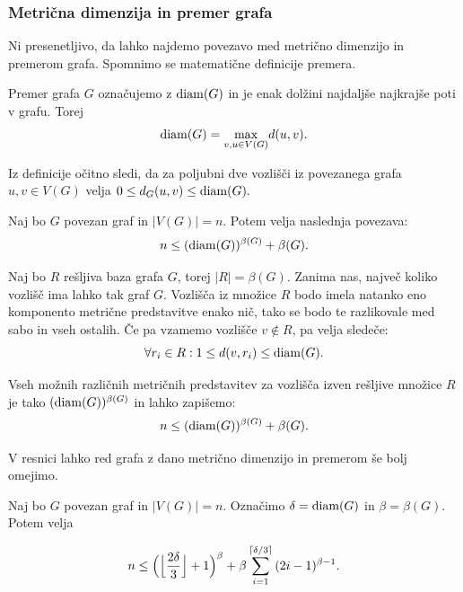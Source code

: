 \documentclass[mat1, tisk]{fmfdelo}
\begin{document}
\subsubsection{Metrična dimenzija in premer grafa} \label{ss:mdim_premer}

Ni presenetljivo, da lahko najdemo povezavo med metrično dimenzijo in premerom grafa.
Spomnimo se matematične definicije premera.

\begin{definicija} \label{def:premer}
    Premer grafa $G$ označujemo z ${\rm diam}(G)$ in je enak dolžini najdaljše najkrajše 
    poti v grafu. Torej $${\rm diam}(G) = \underset{v, u \in V(G)}{\max} d(u, v).$$
\end{definicija}

Iz definicije očitno sledi, da za poljubni dve vozlišči iz povezanega grafa $u, v \in V(G)$
velja $0 \leq d_G (u, v) \leq {\rm diam}(G).$

\begin{trditev}\label{trd:groba_meja_mdim_premer}
    Naj bo $G$ povezan graf in $|V(G)| = n$. Potem velja naslednja povezava:
    $$n \leq ({\rm diam}(G))^{\beta (G)} + \beta (G). $$
\end{trditev}

\begin{dokaz}
    Naj bo $R$ rešljiva baza grafa $G$, torej $|R| = \beta(G).$ Zanima nas, največ koliko 
    vozlišč ima lahko tak graf $G$. Vozlišča iz množice $R$ bodo imela natanko eno 
    komponento metrične predstavitve enako nič, tako se bodo te razlikovale med sabo in 
    vseh ostalih. Če pa vzamemo vozlišče $v \notin R$, pa velja sledeče:
    $$\forall r_i \in R: 1 \leq d(v, r_i) \leq {\rm diam}(G).$$
    
    Vseh možnih različnih metričnih predstavitev za vozlišča izven rešljive množice $R$ 
    je tako $({\rm diam}(G))^{\beta (G)}$
    in lahko zapišemo:
    $$n \leq ({\rm diam}(G))^{\beta (G)} + \beta (G).$$
\end{dokaz}

V resnici lahko red grafa z dano metrično dimenzijo in premerom še bolj omejimo.

\begin{trditev} \label{trd:meja_mdim_premer}
    Naj bo $G$ povezan graf in $|V(G)| = n$. Označimo $ \delta = {\rm diam}(G)$ in 
    $\beta = \beta (G)$. Potem velja

    $$n \leq \Bigl ( \Bigl \lfloor {\frac{2 \delta}{3}}\Bigr \rfloor + 1 \Bigr )^{\beta} + 
    \beta \sum_{i = 1}^{\lceil \delta /3 \rceil} {(2i - 1)^{\beta - 1}}. $$
\end{trditev}
\end{document}
